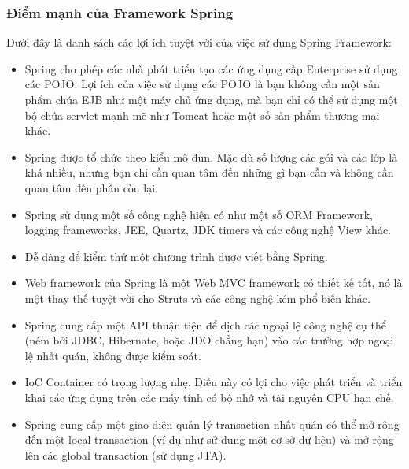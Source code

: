\subsubsection{Điểm mạnh của Framework Spring}

Dưới đây là danh sách các lợi ích tuyệt vời của việc sử dụng Spring Framework:
\begin{itemize}
    \item Spring cho phép các nhà phát triển tạo các ứng dụng cấp Enterprise sử dụng các POJO. Lợi ích của việc sử dụng các POJO là bạn không cần một sản phẩm chứa EJB như một máy chủ ứng dụng, mà bạn chỉ có thể sử dụng một bộ chứa servlet mạnh mẽ như Tomcat hoặc một số sản phẩm thương mại khác.
    \item Spring được tổ chức theo kiểu mô đun. Mặc dù số lượng các gói và các lớp là khá nhiều, nhưng bạn chỉ cần quan tâm đến những gì bạn cần và không cần quan tâm đến phần còn lại.
    \item Spring sử dụng một số công nghệ hiện có như một số ORM Framework, logging frameworks, JEE, Quartz, JDK timers và các công nghệ View khác.
    \item Dễ dàng để kiểm thử một chương trình được viết bằng Spring.
    \item Web framework của Spring là một Web MVC framework có thiết kế tốt, nó là một thay thế tuyệt vời cho Struts và các công nghệ kém phổ biến khác.
    \item Spring cung cấp một API thuận tiện để dịch các ngoại lệ công nghệ cụ thể (ném bởi JDBC, Hibernate, hoặc JDO chẳng hạn) vào các trường hợp ngoại lệ nhất quán, không được kiểm soát.
    \item IoC Container có trọng lượng nhẹ. Điều này có lợi cho việc phát triển và triển khai các ứng dụng trên các máy tính có bộ nhớ và tài nguyên CPU hạn chế.
    \item Spring cung cấp một giao diện quản lý transaction nhất quán có thể mở rộng đến một local transaction (ví dụ như sử dụng một cơ sở dữ liệu) và mở rộng lên các global transaction (sử dụng JTA).
\end{itemize}
